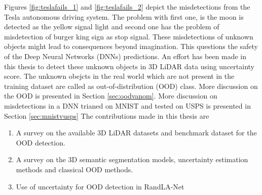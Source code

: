 Figures \ref{fig:teslafails_1} and \ref{fig:teslafails_2} depict the misdetections from the Tesla autonomous driving system.
The problem with first one, is the moon is detected as the yellow signal light and second one has the problem of misdetection of burger king sign as stop signal.
These misdetections of unknown objects might lead to consequences beyond imagination.
This questions the safety of the Deep Neural Networks (DNNs) predictions.
An effort has been made in this thesis to detect these unknown objects in 3D LiDAR data using uncertainty score.
The unknown obejcts in the real world which are not present in the training dataset are called as out-of-distribution (OOD) class. 
More discussion on the OOD is presented in Section \ref{sec:oodvanom}.
More discussion on misdetections in a DNN trianed on MNIST and tested on USPS is presented in Section \ref{sec:mnistvusps}
The contributions made in this thesis are
\begin{enumerate}
    \item A survey on the available 3D LiDAR datasets and benchmark dataset for the OOD detection.
    \item A survey on the 3D semantic segmentation models, uncertainty estimation methods and classical OOD methods.
    \item Use of uncertainty for OOD detection in RandLA-Net
\end{enumerate}
